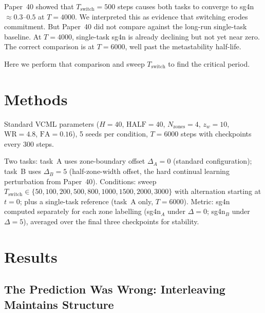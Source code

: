 \documentclass[11pt]{article}
\begin{document}
Paper~40 showed that $T_\mathrm{switch} = 500$ steps causes both tasks to converge to
sg4n $\approx 0.3$--$0.5$ at $T = 4000$.
We interpreted this as evidence that switching erodes commitment.
But Paper~40 did not compare against the long-run single-task baseline.
At $T = 4000$, single-task sg4n is already declining but not yet near zero.
The correct comparison is at $T = 6000$, well past the metastability half-life.

Here we perform that comparison and sweep $T_\mathrm{switch}$ to find the critical period.

\section{Methods}

Standard VCML parameters ($H = 40$, $\mathrm{HALF}=40$, $N_\mathrm{zones}=4$,
$z_w=10$, $\mathrm{WR}=4.8$, $\mathrm{FA}=0.16$), 5 seeds per condition,
$T = 6000$ steps with checkpoints every 300 steps.

Two tasks: task~A uses zone-boundary offset $\Delta_A = 0$ (standard configuration);
task~B uses $\Delta_B = 5$ (half-zone-width offset, the hard continual learning
perturbation from Paper~40).
Conditions: sweep $T_\mathrm{switch} \in \{50, 100, 200, 500, 800, 1000, 1500,
2000, 3000\}$ with alternation starting at $t = 0$; plus a single-task reference
(task~A only, $T = 6000$).
Metric: sg4n computed separately for each zone labelling (sg4n$_A$ under
$\Delta = 0$; sg4n$_B$ under $\Delta = 5$), averaged over the final three
checkpoints for stability.

\section{Results}

\subsection{The Prediction Was Wrong: Interleaving Maintains Structure}
\end{document}

